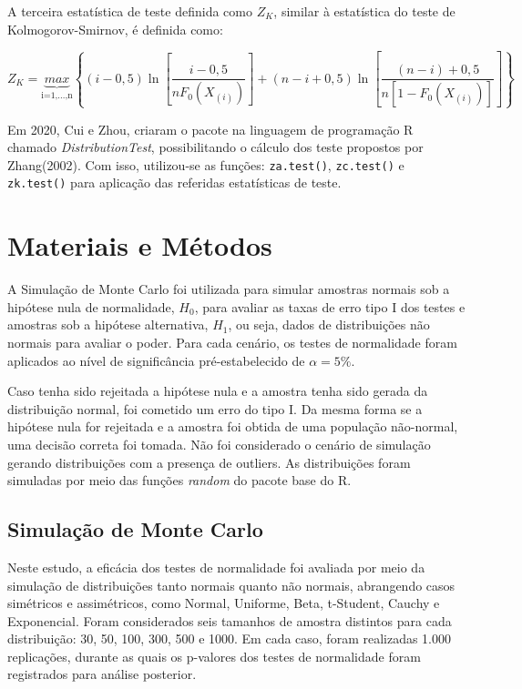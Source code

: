 \documentclass[a4paper,11pt]{article} %
\begin{document}
A terceira estatística de teste definida como $Z_{K}$, similar à estatística do teste de Kolmogorov-Smirnov, é definida como:

\begin{equation}
Z_{K} = \underbrace{max}_{\mbox{i=1,...,n}} \left\{(i - 0,5) \ln\left[ \frac{i - 0,5}{n F_{0}(X_{(i)})} \right] + (n - i + 0,5) \ln\left[ \dfrac{(n - i) + 0,5}{n[1 - F_{0}(X_{(i)})]} \right] \right\}
\end{equation}

Em 2020, Cui e Zhou, criaram o pacote na linguagem de programação R chamado \textit{DistributionTest}, possibilitando o cálculo dos teste propostos por Zhang(2002). Com isso,  utilizou-se as funções: \texttt{za.test()}, \texttt{zc.test()} e \texttt{zk.test()} para aplicação das referidas estatísticas de teste. \vskip0.3cm




\section{Materiais e Métodos}
A Simulação de Monte Carlo foi utilizada para simular amostras normais sob a hipótese nula de normalidade, $H_0$, para avaliar as taxas de erro tipo I dos testes e amostras sob a hipótese alternativa, $H_1$, ou seja, dados de distribuições não normais para avaliar o poder. Para cada cenário, os testes de normalidade foram aplicados ao nível de significância pré-estabelecido de $\alpha = 5\%$. \vskip0.3cm

Caso tenha sido rejeitada a hipótese nula e a amostra tenha sido gerada da distribuição normal, foi cometido um erro do tipo I. Da mesma forma se a hipótese nula for rejeitada e a amostra foi obtida de uma população não-normal, uma decisão correta foi tomada. Não foi considerado o cenário de simulação gerando distribuições com a presença de outliers. As distribuições foram simuladas por meio das funções \textit{random} do pacote base do R.

\subsection{Simulação de Monte Carlo}
Neste estudo, a eficácia dos testes de normalidade foi avaliada por meio da simulação de distribuições tanto normais quanto não normais, abrangendo casos simétricos e assimétricos, como Normal, Uniforme, Beta, t-Student, Cauchy e Exponencial. Foram considerados seis tamanhos de amostra distintos para cada distribuição: 30, 50, 100, 300, 500 e 1000. Em cada caso, foram realizadas 1.000 replicações, durante as quais os p-valores dos testes de normalidade foram registrados para análise posterior. \vskip0.3cm
\end{document}
